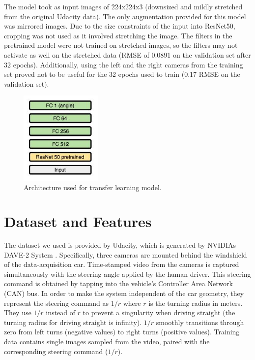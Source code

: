 \documentclass[10pt,twocolumn,letterpaper]{article}
\begin{document}
The model took as input images of 224x224x3 (downsized and mildly stretched from the original Udacity data). The only augmentation provided for this model was mirrored images. Due to the size constraints of the input into ResNet50, cropping was not used as it involved stretching the image. The filters in the pretrained model were not trained on stretched images, so the filters may not activate as well on the stretched data (RMSE of 0.0891 on the validation set after 32 epochs). Additionally, using the left and the right cameras from the training set proved not to be useful for the 32 epochs used to train (0.17 RMSE on the validation set).

\begin{figure}[!htb!]
	\includegraphics[width=4cm]{resnet50trans.JPG}
	\centering
	\caption{Architecture used for transfer learning model.}
	\label{resnet50}
\end{figure}







\section{Dataset and Features}
The dataset we used is provided by Udacity, which is generated by NVIDIAs DAVE-2 System \cite{bojarski2016end}. Specifically, three cameras are mounted behind the windshield of the data-acquisition car. Time-stamped video from the cameras is captured simultaneously with the steering angle applied by the human driver. This steering command is obtained by tapping into the vehicle's Controller Area Network (CAN) bus. In order to make the system independent of the car geometry, they represent the steering command as $1/r$ where $r$ is the turning radius in meters. They use $1/r$ instead of $r$ to prevent a singularity when driving straight (the turning radius for driving straight is infinity). $1/r$ smoothly transitions through zero from left turns (negative values) to right turns (positive values). Training data contains single images sampled from the video, paired with the corresponding steering command ($1/r$).
\end{document}
